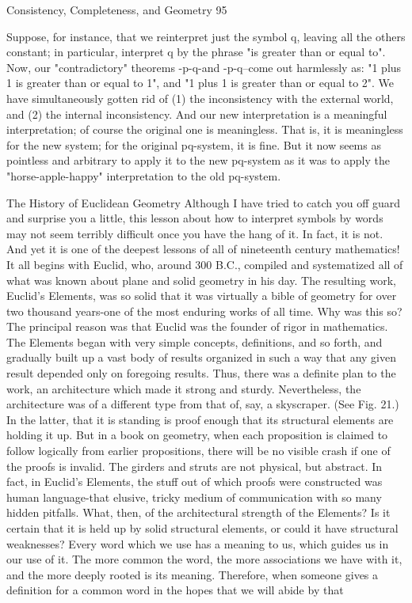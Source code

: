 Consistency, Completeness, and Geometry                                                    95

Suppose, for instance, that we reinterpret just the symbol q, leaving all the others
constant; in particular, interpret q by the phrase "is greater than or equal to". Now, our
"contradictory" theorems -p-q-and -p-q--come out harmlessly as: "1 plus 1 is greater than
or equal to 1", and "1 plus 1 is greater than or equal to 2". We have simultaneously gotten
rid of (1) the inconsistency with the external world, and (2) the internal inconsistency.
And our new interpretation is a meaningful interpretation; of course the original one is
meaningless. That is, it is meaningless for the new system; for the original pq-system, it is
fine. But it now seems as pointless and arbitrary to apply it to the new pq-system as it
was to apply the "horse-apple-happy" interpretation to the old pq-system.

                        The History of Euclidean Geometry
        Although I have tried to catch you off guard and surprise you a little, this lesson
about how to interpret symbols by words may not seem terribly difficult once you have
the hang of it. In fact, it is not. And yet it is one of the deepest lessons of all of nineteenth
century mathematics! It all begins with Euclid, who, around 300 B.C., compiled and
systematized all of what was known about plane and solid geometry in his day. The
resulting work, Euclid's Elements, was so solid that it was virtually a bible of geometry
for over two thousand years-one of the most enduring works of all time. Why was this
so?
        The principal reason was that Euclid was the founder of rigor in mathematics. The
Elements began with very simple concepts, definitions, and so forth, and gradually built
up a vast body of results organized in such a way that any given result depended only on
foregoing results. Thus, there was a definite plan to the work, an architecture which made
it strong and sturdy.
        Nevertheless, the architecture was of a different type from that of, say, a
skyscraper. (See Fig. 21.) In the latter, that it is standing is proof enough that its structural
elements are holding it up. But in a book on geometry, when each proposition is claimed
to follow logically from earlier propositions, there will be no visible crash if one of the
proofs is invalid. The girders and struts are not physical, but abstract. In fact, in Euclid's
Elements, the stuff out of which proofs were constructed was human language-that
elusive, tricky medium of communication with so many hidden pitfalls. What, then, of
the architectural strength of the Elements? Is it certain that it is held up by solid structural
elements, or could it have structural weaknesses?
        Every word which we use has a meaning to us, which guides us in our use of it.
The more common the word, the more associations we have with it, and the more deeply
rooted is its meaning. Therefore, when someone gives a definition for a common word in
the hopes that we will abide by that





